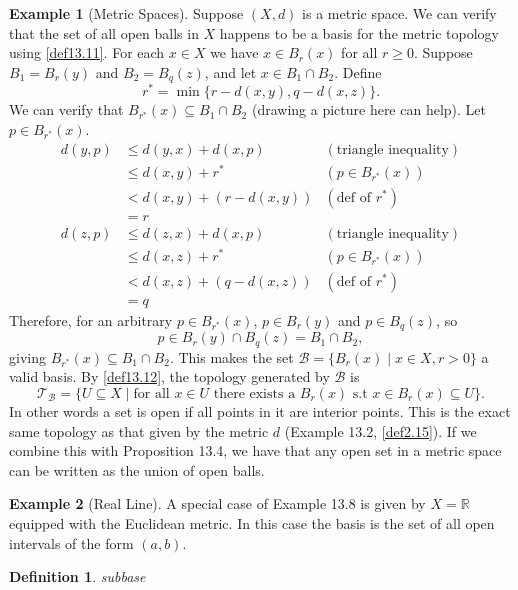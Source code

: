 \documentclass{article}
\newcommand{\R}{\mathbb{R}}
\newcommand{\T}{\mathcal{T}}
\theoremstyle{definition}
\newtheorem{definition}{Definition}[section]
\newtheorem{example}{Example}[section]
\begin{document}
	\begin{example}[Metric Spaces]
		Suppose $(X,d)$ is a metric space. We can verify that the set of all open balls in $X$ happens to be a basis for the metric topology using \cref{def13.11}. For each $x\in X$ we have $x\in B_r(x)$ for all $r \ge 0$. Suppose $B_1 = B_r(y)$ and $B_2 = B_q(z)$, and let $x\in  B_1\cap B_2$. Define $$r^* = \min\{r - d(x,y), q-d(x,z)\}.$$ We can verify that $B_{r^*}(x)\subseteq B_1 \cap B_2$ (drawing a picture here can help). Let $p\in B_{r^*}(x)$. 
		\begin{align*}
			d(y,p) & \le d(y,x) + d(x,p)  &(\text{triangle inequality})\\
			& \le d(x,y) + r^* & (p\in B_{r^*}(x))\\
			& < d(x,y) + (r - d(x,y)) & (\text{def of }r^*)\\
			& = r\\
		d(z,p) & \le d(z,x) + d(x,p)  &(\text{triangle inequality})\\
		& \le d(x,z) + r^* & (p\in B_{r^*}(x))\\
		& < d(x,z) + (q - d(x,z)) & (\text{def of }r^*)\\
		& = q
		\end{align*}
	Therefore, for an arbitrary $p\in B_{r^*}(x)$, $p\in B_{r}(y)$ and $p\in B_{q}(z)$, so 
	$$ p \in  B_{r}(y) \cap  B_{q}(z) = B_1\cap B_2,$$ giving $B_{r^*}(x)\subseteq B_1 \cap B_2$. This makes the set $\mathscr{B} = \{B_r(x) \mid x\in X, r>0\} $ a valid basis. By \cref{def13.12}, the topology generated by $\mathcal B$ is 
	$$ \T_{\mathscr B} =\{U\subseteq X\mid \text{for all }x\in U\text{ there exists a }B_r(x)\text{ s.t }x\in B_r(x)\subseteq U\}.$$ In other words a set is open if all points in it are interior points. This is the exact same topology as that given by the metric $d$ (Example 13.2, \cref{def2.15}). If we combine this with Proposition 13.4, we have that any open set in a metric space can be written as the union of open balls.
	\end{example}

	

	\begin{example}[Real Line]
		A special case of Example 13.8 is given by $X = \R$ equipped with the Euclidean metric. In this case the basis is the set of all open intervals of the form $(a,b)$.
	\end{example}

	\begin{definition}
	 \textit{\color{red}subbase}
	\end{definition}
\end{document}
